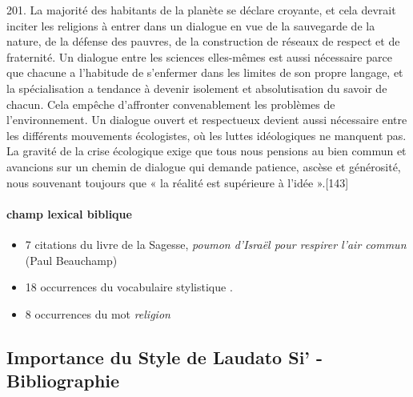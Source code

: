 \begin{singlequote}
        201. La majorité des habitants de la planète se déclare croyante, et cela devrait inciter les religions à entrer dans un dialogue en vue de la sauvegarde de la nature, de la défense des pauvres, de la construction de réseaux de respect et de fraternité. Un dialogue entre les sciences elles-mêmes est aussi nécessaire parce que chacune a l’habitude de s’enfermer dans les limites de son propre langage, et la spécialisation a tendance à devenir isolement et absolutisation du savoir de chacun. Cela empêche d’affronter convenablement les problèmes de l’environnement. Un dialogue ouvert et respectueux devient aussi nécessaire entre les différents mouvements écologistes, où les luttes idéologiques ne manquent pas. La gravité de la crise écologique exige que tous nous pensions au bien commun et avancions sur un chemin de dialogue qui demande patience, ascèse et générosité, nous souvenant toujours que « la réalité est supérieure à l’idée ».[143]
\end{singlequote}

\paragraph{champ lexical biblique}
\begin{itemize}
    \item  7 citations du livre de la Sagesse, \textit{poumon d'Israël pour respirer l'air commun} (Paul Beauchamp) \cite{goujon_laudato_2022} 
    \item 18 occurrences du vocabulaire stylistique \cite{theobald_courage_2021}. 
    \item 8 occurrences du mot \textit{religion}
\end{itemize}
\begin{comment}
    https://rpubs.com/datadataguy13/1011253
    https://pypi.org/project/lexicalrichness/#example-use-cases
    https://newscatcherapi.com/blog/ultimate-guide-to-text-similarity-with-python
\end{comment}
\subsection{Importance du Style de Laudato Si’ - Bibliographie}

